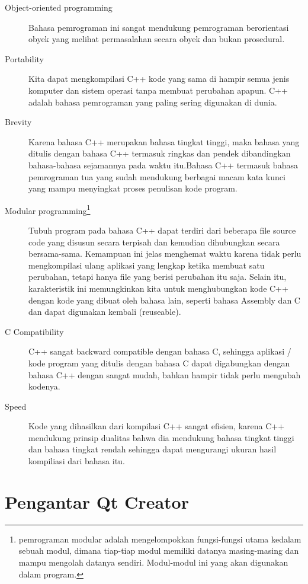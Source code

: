 \begin{description}

\item[Object-oriented programming]
Bahasa pemrograman ini sangat mendukung pemrograman berorientasi obyek
yang melihat permasalahan secara obyek dan bukan prosedural.
\item[Portability]
Kita dapat mengkompilasi C++ kode yang sama di hampir semua jenis
komputer dan sistem operasi tanpa membuat perubahan apapun. C++ adalah
bahasa pemrograman yang paling sering digunakan di dunia.
\item[Brevity]
Karena bahasa C++ merupakan bahasa tingkat tinggi, maka bahasa yang
ditulis dengan bahasa C++ termasuk ringkas dan pendek dibandingkan
bahasa-bahasa sejamannya pada waktu itu.Bahasa C++ termasuk bahasa
pemrograman tua yang sudah mendukung berbagai macam kata kunci yang
mampu menyingkat proses penulisan kode program.
\item[Modular programming\footnote{pemrograman modular adalah mengelompokkan fungsi-fungsi utama kedalam sebuah modul, dimana tiap-tiap modul memiliki datanya masing-masing dan mampu mengolah datanya sendiri. Modul-modul ini yang akan digunakan dalam program.}]
Tubuh program pada bahasa C++ dapat terdiri dari beberapa file source
code yang disusun secara terpisah dan kemudian dihubungkan secara
bersama-sama. Kemampuan ini jelas menghemat waktu karena tidak perlu
mengkompilasi ulang aplikasi yang lengkap ketika membuat satu perubahan,
tetapi hanya file yang berisi perubahan itu saja. Selain itu,
karakteristik ini memungkinkan kita untuk menghubungkan kode C++ dengan
kode yang dibuat oleh bahasa lain, seperti bahasa Assembly dan C dan
dapat digunakan kembali (reuseable).
\item[C Compatibility]
C++ sangat backward compatible dengan bahasa C, sehingga aplikasi / kode
program yang ditulis dengan bahasa C dapat digabungkan dengan bahasa C++
dengan sangat mudah, bahkan hampir tidak perlu mengubah kodenya.
\item[Speed]
Kode yang dihasilkan dari kompilasi C++ sangat efisien, karena C++
mendukung prinsip dualitas bahwa dia mendukung bahasa tingkat tinggi dan
bahasa tingkat rendah sehingga dapat mengurangi ukuran hasil kompiliasi
dari bahasa itu.
\end{description}

\section{Pengantar Qt Creator}\label{pengantar-qt-creator}

